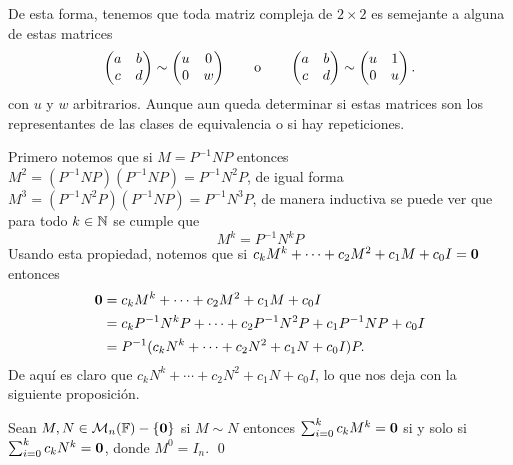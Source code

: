 De esta forma, tenemos que toda matriz compleja de $2 \times 2$ es semejante a alguna de estas matrices
\[
  \begin{pmatrix} a & b \\ c & d \end{pmatrix} \sim \begin{pmatrix} u & 0 \\ 0 & w \end{pmatrix}
    \qquad\text{o}\qquad
    \begin{pmatrix} a & b \\ c & d \end{pmatrix} \sim \begin{pmatrix} u & 1 \\ 0 & u \end{pmatrix}.
\]
con $u$ y $w$ arbitrarios. Aunque aun queda determinar si estas matrices son los representantes de las clases de equivalencia o si hay repeticiones.

Primero notemos que si $M = P^{-1} N P$ entonces $M^2 = (P^{-1} N P)(P^{-1} N P) = P^{-1}N^2 P$, de igual forma $M^3 = (P^{-1}N^2 P) (P^{-1} N P) = P^{-1}N^3 P$, de manera inductiva se puede ver que para todo $k \in \mathbb{N}$ se cumple que
\[
  M^k = P^{-1} N^k P
\]
Usando esta propiedad, notemos que si $c_k M^k + \cdots + c_2 M^2 + c_1 M + c_0 I = \mathbf{0}$ entonces
\begin{align*}
  \mathbf{0} &= c_k M^k + \cdots + c_2 M^2 + c_1 M + c_0 I \\
    &= c_k P^{-1}N^k P + \cdots + c_2 P^{-1}N^2 P + c_1 P^{-1}N P + c_0 I \\
    &= P^{-1} (c_k N^k + \cdots + c_2 N^2 + c_1 N + c_0 I) P.
\end{align*}
De aquí es claro que $c_k N^k + \cdots + c_2 N^2 + c_1 N + c_0 I$, lo que nos deja con la siguiente proposición.

\begin{prop}
  Sean $M, N \in \mathcal{M}_n(\mathbb{F}) - \{\mathbf{0}\}$ si $M \sim N$ entonces $\sum_{i=0}^k c_k M^k = \mathbf{0}$ si y solo si $\sum_{i=0}^k c_k N^k = \mathbf{0}$, donde $M^0 = I_n$. \qed
\end{prop}

